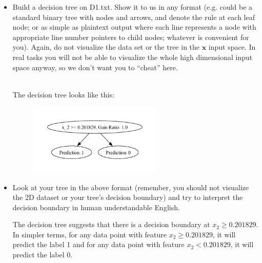 \documentclass[a4paper]{article}
\theoremstyle{definition}
\def\x{\mathbf x}
\newenvironment{soln}{
    \leavevmode\color{blue}\ignorespaces
}{}
\begin{document}
\begin{enumerate}
\begin{itemize}
  \item Build a decision tree on D1.txt.  Show it to us in any format (e.g. could be a standard binary tree with nodes and arrows, and denote the rule at each leaf node; or as simple as plaintext output where each line represents a node with appropriate line number pointers to child nodes; whatever is convenient for you). Again, do not visualize the data set or the tree in the $\x$ input space.  In real tasks you will not be able to visualize the whole high dimensional input space anyway, so we don't want you to ``cheat'' here. 
  \begin{soln}
  \\
    The decision tree looks like this:
    \begin{figure}[h!]
        \centering
        \includegraphics[width=0.6\textwidth]{images/D1Tree.pdf}  
        \captionsetup{labelformat=empty}
        \caption{}
        \label{fig:mixed}
    \end{figure}
  \end{soln}
  
  \item Look at your tree in the above format (remember, you should not visualize the 2D dataset or your tree's decision boundary) and try to interpret the decision boundary in human understandable English. 
  \begin{soln}
      The decision tree suggests that there is a decision boundary at $x_2 \geq 0.201829$. In simpler terms, for any data point with feature $x_2 \geq 0.201829$, it will predict the label 1 and for any data point with feature $x_2 < 0.201829$, it will predict the label 0.
  \end{soln}
  

\end{itemize}
\end{enumerate}
\end{document}
